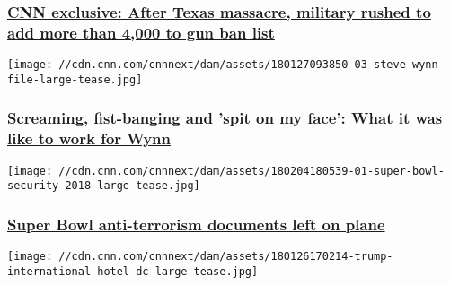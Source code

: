 \hypertarget{cnn-exclusive-after-texas-massacre-military-rushed-to-add-more-than-4000-to-gun-ban-list}{%
\subsubsection{\texorpdfstring{\href{/2018/02/12/us/gun-background-check-backlog-military-dishonorable-discharge-invs/index.html}{CNN
exclusive: After Texas massacre, military rushed to add more than 4,000
to gun ban
list}}{CNN exclusive: After Texas massacre, military rushed to add more than 4,000 to gun ban list}}\label{cnn-exclusive-after-texas-massacre-military-rushed-to-add-more-than-4000-to-gun-ban-list}}

\href{/2018/02/09/us/steve-wynn-employees-treatment/index.html}{}

\texttt{[image: //cdn.cnn.com/cnnnext/dam/assets/180127093850-03-steve-wynn-file-large-tease.jpg]}

\hypertarget{screaming-fist-banging-and-spit-on-my-face-what-it-was-like-to-work-for-wynn}{%
\subsubsection{\texorpdfstring{\href{/2018/02/09/us/steve-wynn-employees-treatment/index.html}{Screaming,
fist-banging and 'spit on my face': What it was like to work for
Wynn}}{Screaming, fist-banging and 'spit on my face': What it was like to work for Wynn}}\label{screaming-fist-banging-and-spit-on-my-face-what-it-was-like-to-work-for-wynn}}

\href{/2018/02/05/us/dhs-super-bowl-national-security-documents-left-on-plane-invs/index.html}{}

\texttt{[image: //cdn.cnn.com/cnnnext/dam/assets/180204180539-01-super-bowl-security-2018-large-tease.jpg]}

\hypertarget{super-bowl-anti-terrorism-documents-left-on-plane}{%
\subsubsection{\texorpdfstring{\href{/2018/02/05/us/dhs-super-bowl-national-security-documents-left-on-plane-invs/index.html}{Super
Bowl anti-terrorism documents left on
plane}}{Super Bowl anti-terrorism documents left on plane}}\label{super-bowl-anti-terrorism-documents-left-on-plane}}

\href{/2018/01/27/politics/trump-hotel-occupancy-rates-data/index.html}{}

\texttt{[image: //cdn.cnn.com/cnnnext/dam/assets/180126170214-trump-international-hotel-dc-large-tease.jpg]}


